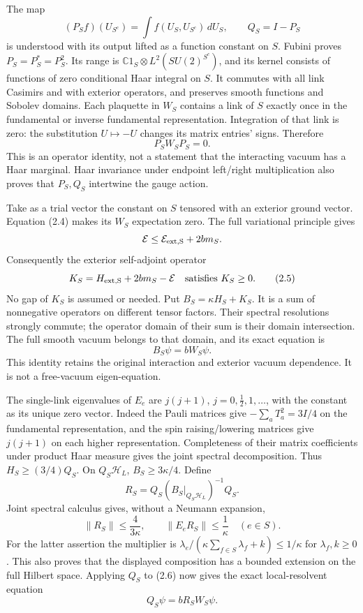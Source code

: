 \documentclass[
]{article}
\begin{document}
The map \[
(P_S f)(U_{S^c})=\int f(U_S,U_{S^c})\,dU_S,\qquad Q_S=I-P_S    \tag{2.3}
\] is understood with its output lifted as a function constant on \(S\).
Fubini proves \(P_S=P_S^*=P_S^2\). Its range is
\(\mathbb C1_S\otimes L^2(SU(2)^{S^c})\), and its kernel consists of
functions of zero conditional Haar integral on \(S\). It commutes with
all link Casimirs and with exterior operators, and preserves smooth
functions and Sobolev domains. Each plaquette in \(W_S\) contains a link
of \(S\) exactly once in the fundamental or inverse fundamental
representation. Integration of that link is zero: the substitution
\(U\mapsto -U\) changes its matrix entries' signs. Therefore \[
P_SW_SP_S=0.                                                   \tag{2.4}
\] This is an operator identity, not a statement that the interacting
vacuum has a Haar marginal. Haar invariance under endpoint left/right
multiplication also proves that \(P_S,Q_S\) intertwine the gauge action.

Take as a trial vector the constant on \(S\) tensored with an exterior
ground vector. Equation (2.4) makes its \(W_S\) expectation zero. The
full variational principle gives \[
\mathcal E\le\mathcal E_{\rm ext,S}+2bm_S.
\] Consequently the exterior self-adjoint operator \[
K_S=H_{\rm ext,S}+2bm_S-\mathcal E\quad\hbox{satisfies }K_S\ge0.
                                                               \tag{2.5}
\] No gap of \(K_S\) is assumed or needed. Put \(B_S=\kappa H_S+K_S\).
It is a sum of nonnegative operators on different tensor factors. Their
spectral resolutions strongly commute; the operator domain of their sum
is their domain intersection. The full smooth vacuum belongs to that
domain, and its exact equation is \[
B_S\psi=bW_S\psi.                                             \tag{2.6}
\] This identity retains the original interaction and exterior vacuum
dependence. It is not a free-vacuum eigen-equation.

The single-link eigenvalues of \(E_e\) are \(j(j+1)\),
\(j=0,\frac12,1,\ldots\), with the constant as its unique zero vector.
Indeed the Pauli matrices give \(-\sum_aT_a^2=3I/4\) on the fundamental
representation, and the spin raising/lowering matrices give \(j(j+1)\)
on each higher representation. Completeness of their matrix coefficients
under product Haar measure gives the joint spectral decomposition. Thus
\(H_S\ge(3/4)Q_S\). On \(Q_S\mathcal H_L\), \(B_S\ge3\kappa/4\). Define
\[
R_S=Q_S(B_S|_{Q_S\mathcal H_L})^{-1}Q_S.
\] Joint spectral calculus gives, without a Neumann expansion, \[
\|R_S\|\le\frac4{3\kappa},\qquad
\|E_eR_S\|\le\frac1\kappa\quad(e\in S).                      \tag{2.7}
\] For the latter assertion the multiplier is
\(\lambda_e/(\kappa\sum_{f\in S}\lambda_f+k)\le1/\kappa\) for
\(\lambda_f,k\ge0\). This also proves that the displayed composition has
a bounded extension on the full Hilbert space. Applying \(Q_S\) to (2.6)
now gives the exact local-resolvent equation \[
Q_S\psi=bR_SW_S\psi.                                          \tag{2.8}
\]
\end{document}
